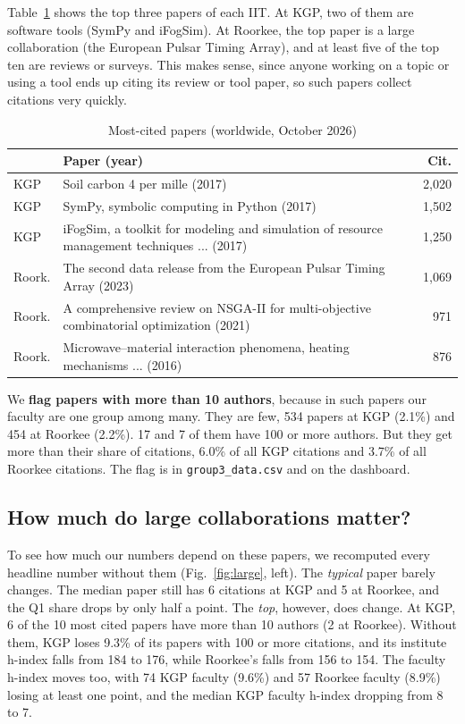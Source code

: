\documentclass[conference,10pt]{IEEEtran}
\begin{document}
Table~\ref{tab:cited} shows the top three papers of each IIT. At KGP, two of them are software tools (SymPy and
iFogSim). At Roorkee, the top paper is a large collaboration (the European Pulsar Timing Array), and at least five of the top ten are reviews or surveys. This makes sense, since anyone working on a topic or using a tool ends up citing its review or tool paper, so such papers collect citations very quickly.

\begin{table}[!t]
\centering
\caption{Most-cited papers (worldwide, October 2026)}
\label{tab:cited}
\footnotesize
\begin{tabular}{@{}l>{\raggedright\arraybackslash}p{5.0cm}r@{}}
\toprule
 & \textbf{Paper (year)} & \textbf{Cit.} \\
\midrule
KGP & Soil carbon 4 per mille (2017) & 2,020 \\
KGP & SymPy, symbolic computing in Python (2017) & 1,502 \\
KGP & iFogSim, a toolkit for modeling and simulation of resource management techniques ... (2017) & 1,250 \\
\midrule
Roork. & The second data release from the European Pulsar Timing Array (2023) & 1,069 \\
Roork. & A comprehensive review on NSGA-II for multi-objective combinatorial optimization (2021) & 971 \\
Roork. & Microwave--material interaction phenomena, heating mechanisms ... (2016) & 876 \\
\bottomrule
\end{tabular}
\end{table}

We \textbf{flag papers with more than 10 authors}, because in such papers our faculty are one group among many. They are few, 534 papers at KGP (2.1\%) and 454 at Roorkee (2.2\%). 17 and 7 of them have 100 or more authors. But they get more than their share of citations, 6.0\% of all KGP citations and 3.7\% of all Roorkee citations. The flag is in \texttt{group3\_data.csv} and on the dashboard.

\subsection{How much do large collaborations matter?}
To see how much our numbers depend on these papers, we recomputed every headline number without them
(Fig.~\ref{fig:large}, left). The \textit{typical} paper barely changes. The median paper still has 6 citations at KGP
and 5 at Roorkee, and the Q1 share drops by only half a point. The \textit{top}, however, does change. At KGP, 6 of the
10 most cited papers have more than 10 authors (2 at Roorkee). Without them, KGP loses 9.3\% of its papers with 100 or
more citations, and its institute h-index falls from 184 to 176, while Roorkee's falls from 156 to 154. The faculty
h-index moves too, with 74 KGP faculty (9.6\%) and 57 Roorkee faculty (8.9\%) losing at least one point, and the median
KGP faculty h-index dropping from 8 to 7.
\end{document}
